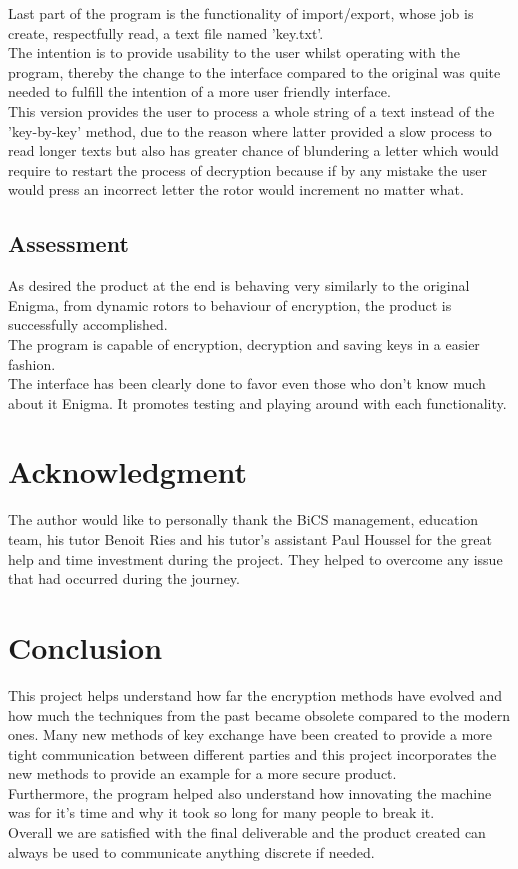 \documentclass[conference,compsoc]{IEEEtran}
\begin{document}
Last part of the program is the functionality of import/export, whose job is create, respectfully read, a text file named 'key.txt'.\\

The intention is to provide usability to the user whilst operating with the program, thereby the change to the interface compared to the original was quite needed to fulfill the intention of a more user friendly interface.\\
This version provides the user to process a whole string of a text instead of the 'key-by-key' method, due to the reason where latter provided a slow process to read longer texts but also has greater chance of blundering a letter which would require to restart the process of decryption because if by any mistake the user would press an incorrect letter the rotor would increment no matter what.\\

\subsection{Assessment}
As desired the product at the end is behaving very similarly to the original Enigma, from dynamic rotors to behaviour of encryption, the product is successfully accomplished.\\
The program is capable of encryption, decryption and saving keys in a easier fashion.\\
The interface has been clearly done to favor even those who don't know much about it Enigma. It promotes testing and playing around with each functionality.\\


\section*{Acknowledgment}
The author would like to personally thank the BiCS management, education team, his tutor Benoit Ries and his tutor's assistant Paul Houssel for the great help and time investment during the project. They helped to overcome any issue that had occurred during the journey.


\section{Conclusion}

This project helps understand how far the encryption methods have evolved and how much the techniques from the past became obsolete compared to the modern ones. Many new methods of key exchange have been created to provide a more tight communication between different parties and this project incorporates the new methods to provide an example for a more secure product.\\   
Furthermore, the program helped also understand how innovating the machine was for it's time and why it took so long for many people to break it.\\
Overall we are satisfied with the final deliverable and the product created can always be used to communicate anything discrete if needed.\\
\end{document}
